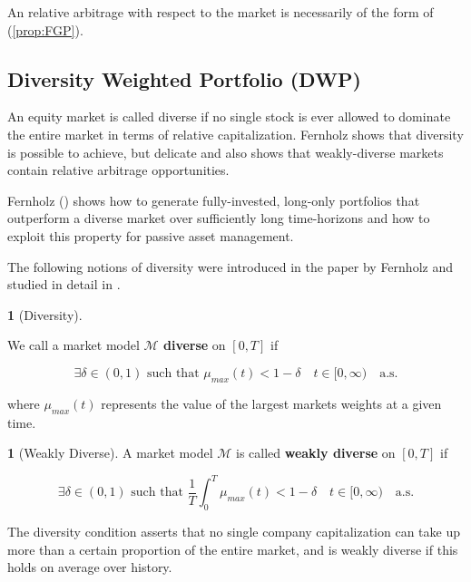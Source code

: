 \documentclass[british]{amsart}
\numberwithin{equation}{section}
\numberwithin{figure}{section}
\theoremstyle{plain}
\theoremstyle{definition}
\newtheorem{defn}[thm]{\protect\definitionname}
\theoremstyle{plain}
\theoremstyle{plain}
\theoremstyle{plain}
\theoremstyle{remark}
\theoremstyle{plain}
\providecommand{\definitionname}{Definition}
\newcommand{\ranget}{t\in[0,\infty)}
\newcommand{\almostsurely}{\text{a.s.}}
\begin{document}
An relative arbitrage with respect to the market is necessarily of the form of (\ref{prop:FGP}).

\newpage 

\subsection{Diversity Weighted Portfolio (DWP)}

An equity market is called diverse if no single stock is ever allowed to dominate the entire market in
terms of relative capitalization. Fernholz \cite{fernholz2005} shows that diversity is possible to achieve, but delicate and also shows that weakly-diverse markets contain relative arbitrage opportunities.

Fernholz (\cite{fernholz2002}) shows how to generate fully-invested, long-only portfolios that outperform a diverse market over sufficiently long time-horizons and how to exploit this property for passive asset
management.

The following notions of diversity were introduced in the paper by Fernholz \cite{fernholz1999diversity} and studied in detail in \cite{fernholz2002}.

\begin{defn} [Diversity]
	\label{def:diversity}

	We call a market model \textbf{$\mathcal{M}$ diverse }on $[0,T]$ if 

	\begin{equation}
		\exists \delta \in(0,1) \text{ such that }
			\mu_{max}(t)<1-\delta
		\quad \ranget
		\quad \almostsurely
	\end{equation}

	where $\mu_{max}(t)$ represents the value of the largest markets weights at a given time. 

\end{defn}

\begin{defn} [Weakly Diverse]
	A market model\textbf{ $\mathcal{M}$} is called \textbf{weakly diverse} on $[0,T]$ if 

	\begin{equation}
		\exists \delta \in(0,1) \text{ such that }
			\frac{1}{T} \int_{0}^{T} \mu_{max}(t) < 1-\delta
		\quad \ranget
		\quad \almostsurely
	\end{equation}

\end{defn}

The diversity condition asserts that no single company capitalization can take up more than a certain proportion of the entire market, and is weakly diverse if this holds on average over history.
\end{document}
